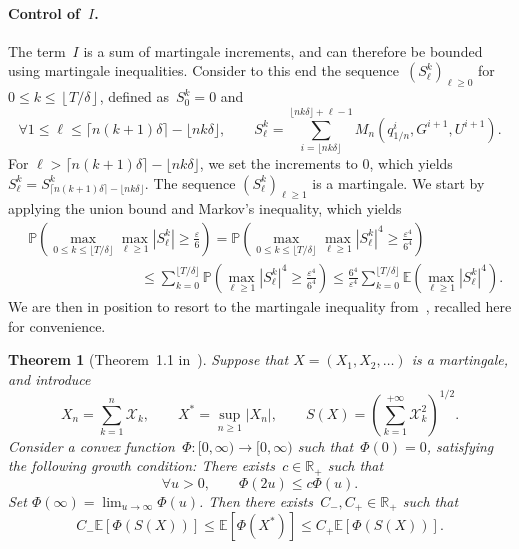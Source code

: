\documentclass{article}
\newtheorem{theorem}{Theorem}
\renewcommand{\leq}{\leqslant}
\renewcommand{\geq}{\geqslant}
\def\E{\mathbb{E}} %
\def\P{\mathbb{P}} %
\begin{document}
\paragraph{Control of~$I$.} The term~$I$ is a sum of martingale increments, and can therefore be bounded using martingale inequalities. Consider to this end the sequence~$(S^k_\ell)_{\ell\geq 0}$ for $0\leq k \leq \left\lfloor T/\delta\right\rfloor$, defined as~$S^k_0 = 0$ and
\[
\forall 1\leq \ell\leq \lceil n(k+1)\delta \rceil-\lfloor nk\delta \rfloor, \qquad S^k_\ell=\sum_{i = \lfloor nk\delta \rfloor}^{\lfloor nk\delta \rfloor+\ell-1 }M_n(q^i_{1/n}, G^{i+1}, U^{i+1}).
\]
For $\ell>\lceil n(k+1)\delta\rceil-\lfloor nk\delta \rfloor$, we set the increments to $0$, which yields $S^k_\ell=S^k_{\lceil n(k+1)\delta\rceil-\lfloor nk\delta \rfloor}$. The sequence $(S^k_\ell)_{\ell\geq 1}$ is a martingale. We start by applying the union bound and Markov's inequality, which yields
\begin{equation}
  \label{eq:proba-martingale}
  \begin{aligned}
    & \P\left(\max_{0\leq k \leq \lfloor T/\delta \rfloor}\max_{\ell\geq 1}\left |S^k_\ell\right|  \geq \frac{\varepsilon}{6}\right) = \P\left(\max_{0\leq k \leq \lfloor T/\delta \rfloor}\max_{\ell \geq 1}\left |S^k_\ell\right|^4  \geq \frac{\varepsilon^4}{6^4}\right)  \\
    & \qquad\qquad\qquad\qquad \leq \sum_{k=0}^{\lfloor T/\delta\rfloor} \P\left(\max_{\ell \geq 1}|S^k_\ell|^4  \geq \frac{\varepsilon^4}{6^4}\right)\leq \frac{6^4}{\varepsilon^4}\sum_{k=0}^{\lfloor T/\delta\rfloor} \E\left(\max_{\ell \geq 1}|S^k_\ell|^4 \right).
  \end{aligned}
\end{equation}
We are then in position to resort to the martingale inequality from~\cite[Theorem 1.1]{burkholder1972integral}, recalled here for convenience. 

\begin{theorem}[Theorem~1.1 in~\cite{burkholder1972integral}]
\label{thm:bounds-moments-martingale}
Suppose that $X=(X_1,X_2,\ldots)$ is a martingale, and introduce
\begin{equation}
  X_n = \sum_{k=1}^n \mathscr{X}_k,
  \qquad
  X^* = \sup_{n \geq 1} |X_n|,
  \qquad
  S(X) = \left(\sum_{k=1}^{+\infty} \mathscr{X}_k^2\right)^{1/2}.
\end{equation}
Consider a convex function~$\Phi : [0,\infty) \to [0,\infty)$ such that~$\Phi(0)=0$, satisfying the following growth condition: There exists~$c \in \mathbb{R}_+$ such that
\[
\forall u > 0, \qquad \Phi(2u)\leq c\Phi(u).
\]
Set $\Phi(\infty) = \lim_{u\to \infty} \Phi(u)$. Then there exists~$C_-,C_+ \in \mathbb{R}_+$ such that
\[
C_- \E\left[ \Phi(S(X))\right]\leq \E\left[\Phi(X^*)\right] \leq C_+ \E\left[\Phi(S(X))\right].
\]
\end{theorem}
\end{document}
